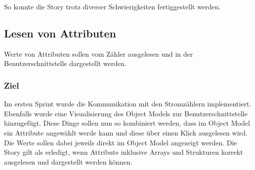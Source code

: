 So konnte die Story trotz diverser Schwierigkeiten fertiggestellt werden.

\subsection{Lesen von Attributen}
\dq Werte von Attributen sollen vom Zähler ausgelesen und in der Benutzerschnittstelle dargestellt werden.\dq
\subsubsection{Ziel}
Im ersten Sprint wurde die Kommunikation mit den Stromzählern implementiert.
Ebenfalls wurde eine Visualisierung des Object Models zur Benutzerschnittstelle hinzugefügt.
Diese Dinge sollen nun so kombiniert werden, dass im Object Model ein Attribute angewählt werde kann und diese über einen Klick ausgelesen wird.
Die Werte sollen dabei jeweils direkt im Object Model angezeigt werden.
Die Story gilt als erledigt, wenn Attribute inklusive Arrays und Strukturen korrekt ausgelesen und dargestellt werden können.


